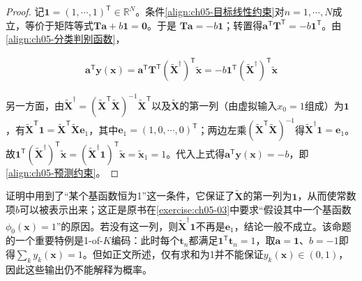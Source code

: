 \documentclass[../../main.tex]{subfiles}
\begin{document}
\begin{proof}
记$\boldsymbol{1}=(1,\cdots,1)^{\mathsf{T}}\in\mathbb{R}^{N}$。条件\eqref{align:ch05-目标线性约束}对$n=1,\cdots,N$成立，等价于矩阵等式$\boldsymbol{T}\boldsymbol{a}+b\boldsymbol{1}=\boldsymbol{0}$。于是
$\boldsymbol{T}\boldsymbol{a}=-b\boldsymbol{1}$；转置得$\boldsymbol{a}^{\mathsf{T}}\boldsymbol{T}^{\mathsf{T}}=-b\boldsymbol{1}^{\mathsf{T}}$。由\eqref{align:ch05-分类判别函数}，

\begin{align}
  \boldsymbol{a}^{\mathsf{T}}\boldsymbol{y}(\boldsymbol{x})=\boldsymbol{a}^{\mathsf{T}}\boldsymbol{T}^{\mathsf{T}}(\tilde{\boldsymbol{X}}^{\dagger})^{\mathsf{T}}\tilde{\boldsymbol{x}}=-b\boldsymbol{1}^{\mathsf{T}}(\tilde{\boldsymbol{X}}^{\dagger})^{\mathsf{T}}\tilde{\boldsymbol{x}}
\end{align}

另一方面，由$\tilde{\boldsymbol{X}}^{\dagger}=(\tilde{\boldsymbol{X}}^{\mathsf{T}}\tilde{\boldsymbol{X}})^{-1}\tilde{\boldsymbol{X}}^{\mathsf{T}}$以及$\tilde{\boldsymbol{X}}$的第一列（由虚拟输入$x_0=1$组成）为$\boldsymbol{1}$，有$\tilde{\boldsymbol{X}}^{\mathsf{T}}\boldsymbol{1}=\tilde{\boldsymbol{X}}^{\mathsf{T}}\tilde{\boldsymbol{X}}\boldsymbol{e}_1$，其中$\boldsymbol{e}_1=(1,0,\cdots,0)^{\mathsf{T}}$；两边左乘$(\tilde{\boldsymbol{X}}^{\mathsf{T}}\tilde{\boldsymbol{X}})^{-1}$得$\tilde{\boldsymbol{X}}^{\dagger}\boldsymbol{1}=\boldsymbol{e}_1$。故$\boldsymbol{1}^{\mathsf{T}}(\tilde{\boldsymbol{X}}^{\dagger})^{\mathsf{T}}\tilde{\boldsymbol{x}}=(\tilde{\boldsymbol{X}}^{\dagger}\boldsymbol{1})^{\mathsf{T}}\tilde{\boldsymbol{x}}=\tilde{\boldsymbol{x}}_1=1$。代入上式得$\boldsymbol{a}^{\mathsf{T}}\boldsymbol{y}(\boldsymbol{x})=-b$，即\eqref{align:ch05-预测约束}。
\end{proof}

\begin{remark}
证明中用到了“某个基函数恒为1”这一条件，它保证了$\tilde{\boldsymbol{X}}$的第一列为$\boldsymbol{1}$，从而使常数项$b$可以被表示出来；这正是原书在\cref{exercise:ch05-03}中要求“假设其中一个基函数$\phi_0(\boldsymbol{x})=1$”的原因。若没有这一列，则$\tilde{\boldsymbol{X}}^{\dagger}\boldsymbol{1}$不再是$\boldsymbol{e}_1$，结论一般不成立。该命题的一个重要特例是1-of-$K$编码：此时每个$\boldsymbol{t}_n$都满足$\boldsymbol{1}^{\mathsf{T}}\boldsymbol{t}_n=1$，取$\boldsymbol{a}=\boldsymbol{1}$、$b=-1$即得$\sum_k y_k(\boldsymbol{x})=1$。但如正文所述，仅有求和为1并不能保证$y_k(\boldsymbol{x})\in(0,1)$，因此这些输出仍不能解释为概率。
\end{remark}
\end{document}
